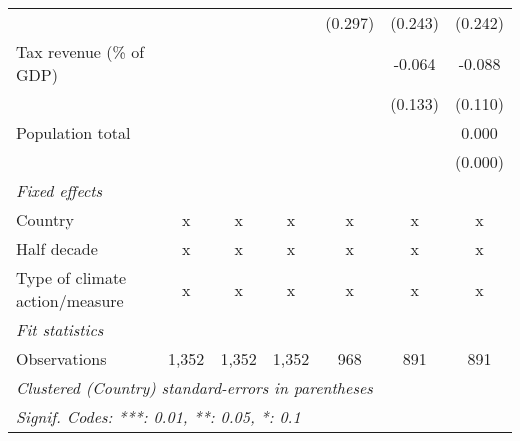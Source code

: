 \begin{tabular}{lcccccc}
                                                    &              &              &               & (0.297)       & (0.243)       & (0.242)\\   
   Tax revenue (\% of GDP)                          &              &              &               &               & -0.064        & -0.088\\   
                                                    &              &              &               &               & (0.133)       & (0.110)\\   
   Population total                                 &              &              &               &               &               & 0.000\\   
                                                    &              &              &               &               &               & (0.000)\\   
   \emph{Fixed effects}\\
   Country                                          & x            & x            & x             & x             & x             & x\\  
   Half decade                                      & x            & x            & x             & x             & x             & x\\  
   Type of climate action/measure                   & x            & x            & x             & x             & x             & x\\  
   \midrule \emph{Fit statistics}\\
   Observations                                     & 1,352        & 1,352        & 1,352         & 968           & 891           & 891\\  
   \midrule
   \multicolumn{7}{l}{\emph{Clustered (Country) standard-errors in parentheses}}\\
   \multicolumn{7}{l}{\emph{Signif. Codes: ***: 0.01, **: 0.05, *: 0.1}}\\
\end{tabular}
\par\endgroup


